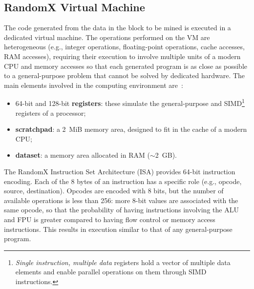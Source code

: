 \documentclass[conference]{IEEEtran}
\begin{document}
\subsection{RandomX Virtual Machine}
The code generated from the data in the block to be mined is executed in a dedicated virtual machine. The operations performed on the VM are heterogeneous (e.g., integer operations, floating-point operations, cache accesses, RAM accesses), requiring their execution to involve multiple units of a modern CPU and memory accesses so that each generated program is as close as possible to a general-purpose problem that cannot be solved by dedicated hardware. The main elements involved in the computing environment are~\cite{randomx_design}:
\begin{itemize}
    \item 64-bit and 128-bit \textbf{registers}: these simulate the general-purpose and SIMD\footnote{\textit{Single instruction, multiple data} registers hold a vector of multiple data elements and enable parallel operations on them through SIMD instructions.} registers of a processor;
    \item \textbf{scratchpad}: a 2~MiB memory area, designed to fit in the cache of a modern CPU;
    \item \textbf{dataset}: a memory area allocated in RAM ($\sim$2~GB).
\end{itemize}

The RandomX Instruction Set Architecture (ISA) provides 64-bit instruction encoding. Each of the 8 bytes of an instruction has a specific role (e.g., opcode, source, destination). Opcodes are encoded with 8 bits, but the number of available operations is less than 256: more 8-bit values are associated with the same opcode, so that the probability of having instructions involving the ALU and FPU is greater compared to having flow control or memory access instructions. This results in execution similar to that of any general-purpose program.
\end{document}
